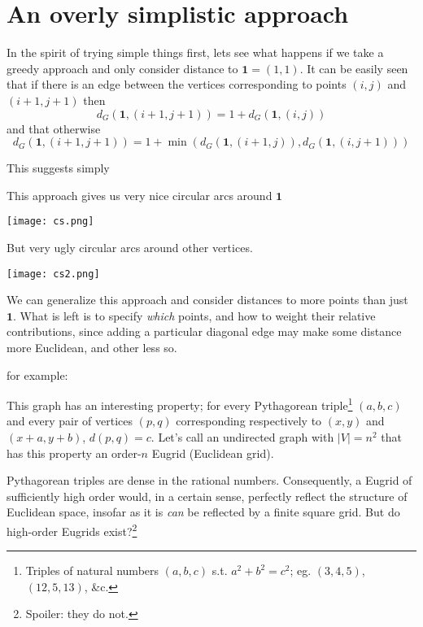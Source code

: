 \documentclass[letterpaper]{article}
\begin{document}
\section{An overly simplistic approach}

In the spirit of trying simple things first, lets see what happens if we take a greedy
approach and only consider distance to $\mathbf{1} = (1, 1)$. It can be easily seen that
if there is an edge between the vertices corresponding to points $(i, j)$ and $(i + 1, j+1)$
then
\begin{equation}
  d_G(\mathbf{1}, (i+1, j+1)) = 1 + d_G(\mathbf{1}, (i, j))
\end{equation}
and that otherwise
\begin{equation}
  d_G(\mathbf{1}, (i+1, j+1)) = 1 + \min(d_G(\mathbf{1}, (i + 1, j)),
                                         d_G(\mathbf{1}, (i, j + 1)))
\end{equation}

This suggests simply


This approach gives us very nice circular arcs around $\mathbf{1}$

\texttt{[image: cs.png]}

But very ugly circular arcs around other vertices.

\texttt{[image: cs2.png]}

We can generalize this approach and consider distances to more points than just
$\mathbf{1}$. What is left is to specify \emph{which} points, and how to weight their
relative contributions, since adding a particular diagonal edge may make some distance more
Euclidean, and other less so.

for example:

\begin{center}
  
\end{center}

This graph has an interesting property; for every Pythagorean triple\footnote{Triples of
natural numbers $(a, b, c)$ s.t. $a^2 + b^2 = c^2$; eg. $(3, 4, 5)$, $(12, 5, 13)$, \&c.}
$(a, b, c)$ and every pair of vertices $(p, q)$ corresponding respectively to $(x, y)$ and
$(x + a, y + b)$, $d(p, q) = c$. Let's call an undirected graph with $|V| = n^2$ that has
this property an order-$n$ Eugrid (Euclidean grid).

Pythagorean triples are dense in the rational numbers. Consequently, a Eugrid of sufficiently
high order would, in a certain sense, perfectly reflect the structure of Euclidean space, insofar as
it is \emph{can} be reflected by a finite square grid. But do high-order Eugrids
exist?\footnote{Spoiler: they do not.}
\end{document}
